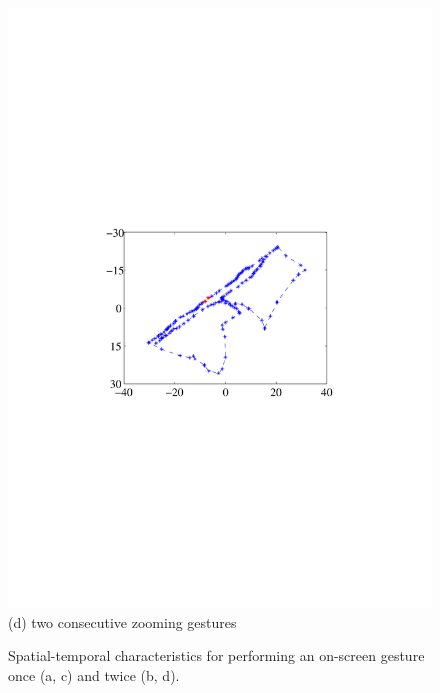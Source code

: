 \begin{figure}[!t]
{\begin{minipage}[t]{0.19\textwidth}
            \includegraphics[width=\textwidth]{fig/gesture-distinction6.pdf}\\
            \centering  (d) two consecutive zooming gestures
            \end{minipage}
        }
        \vspace{-1mm}
        \caption{Spatial-temporal characteristics for performing an on-screen gesture once (a, c) and twice (b, d).}
        \label{fig:gesture-distinction}
        \vspace{-4mm}
    \end{figure}

